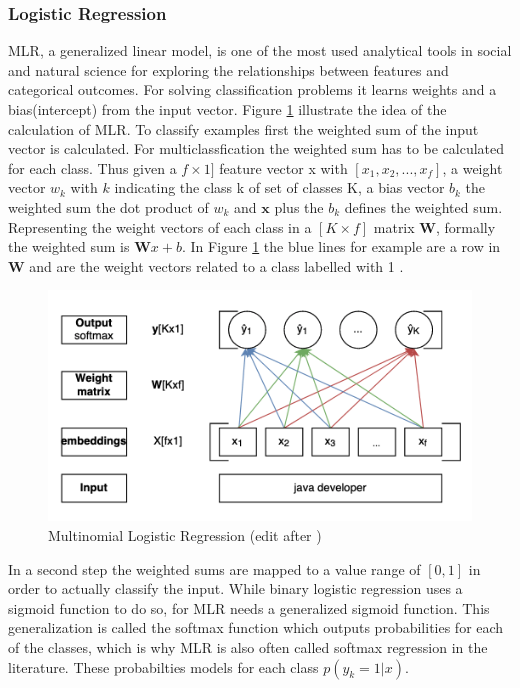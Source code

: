 \documentclass[12pt, a4paper, titlepage]{article}
\begin{document}
\subsubsection{Logistic Regression}
\ac{MLR}, a generalized linear model, is one of the most used analytical tools in social and natural science for exploring the relationships between features and categorical outcomes. For solving classification problems it learns weights and a bias(intercept) from the input vector. Figure \ref{fig: F7} illustrate the idea of the calculation of \ac{MLR}. To classify examples first the weighted sum of the input vector is calculated. For multiclassfication the weighted sum has to be calculated for each class. Thus given a $f \times 1]$ feature vector x with $[x_1, x_2, ..., x_f]$, a weight vector $w_k$ with $k$ indicating the class k of set of classes K, a bias vector $b_k$ the weighted sum the dot product of $w_k$ and $\textbf{x}$ plus the $b_k$ defines the weighted sum. Representing the weight vectors of each class in a $[K \times f]$ matrix $\textbf{W}$, formally the weighted sum is $\textbf{W}x+b$. In Figure \ref{fig: F7} the blue lines for example are a row in $\textbf{W}$ and are the weight vectors related to a class labelled with 1 \citep{jurafsky2021}.

\begin{figure}[hb!]
  \center
  \includegraphics[scale=0.5]{LR.png}
  \caption{\label{fig: F7} Multinomial Logistic Regression (edit after \citep[p.]{jurafsky2021})}
\end{figure}

In a second step the weighted sums are mapped to a value range of $[0,1]$ in order to actually classify the input. While binary logistic regression uses a sigmoid function to do so, for \ac{MLR} needs a generalized sigmoid function. This generalization is called the softmax function which outputs probabilities for each of the classes, which is why \ac{MLR} is also often called softmax regression in the literature. These probabilties models for each class $p(y_k = 1|x)$.
\end{document}
